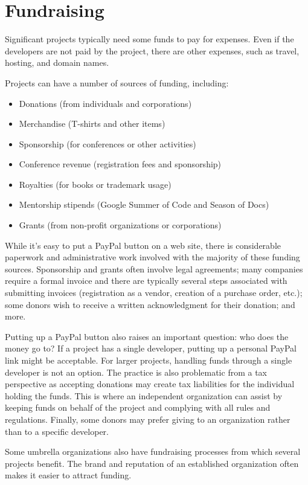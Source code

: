 


\chapter{Fundraising}

Significant projects typically need some funds to pay for expenses.  Even if the developers are not paid by the project, there are other expenses, such as travel, hosting, and domain names.

Projects can have a number of sources of funding, including:

\begin{itemize}

\item Donations (from individuals and corporations)
\item Merchandise (T-shirts and other items)
\item Sponsorship (for conferences or other activities)
\item Conference revenue (registration fees and sponsorship)
\item Royalties (for books or trademark usage)
\item Mentorship stipends (Google Summer of Code and Season of Docs)
\item Grants (from non-profit organizations or corporations)

\end{itemize}

While it's easy to put a PayPal button on a web site, there is considerable paperwork and administrative work involved with the majority of these funding sources.  Sponsorship and grants often involve legal agreements; many companies require a formal invoice and there are typically several steps associated with submitting invoices (registration as a vendor, creation of a purchase order, etc.); some donors wish to receive a written acknowledgment for their donation; and more.

Putting up a PayPal button also raises an important question: who does the money go to?  If a project has a single developer, putting up a personal PayPal link might be acceptable.  For larger projects, handling funds through a single developer is not an option.  The practice is also problematic from a tax perspective as accepting donations may create tax liabilities for the individual holding the funds.  This is where an independent organization can assist by keeping funds on behalf of the project and complying with all rules and regulations.  Finally, some donors may prefer giving to an organization rather than to a specific developer.

Some umbrella organizations also have fundraising processes from which several projects benefit.  The brand and reputation of an established organization often makes it easier to attract funding.

